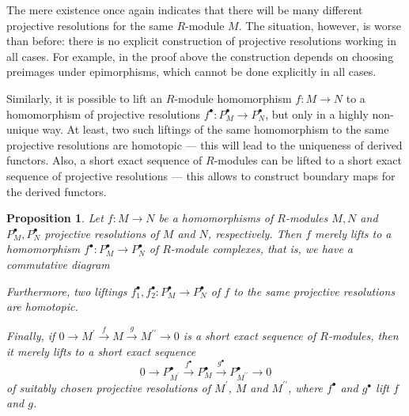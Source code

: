 \documentclass{amsart}
\theoremstyle{plain}
\numberwithin{equation}{section} %
\numberwithin{figure}{section} %
\theoremstyle{plain}
\theoremstyle{plain}
\theoremstyle{plain}
\theoremstyle{plain}
\theoremstyle{plain}
\newtheorem{prop}[thm]{Proposition} %
\theoremstyle{plain}
\theoremstyle{remark}
\theoremstyle{remark}
\theoremstyle{remark}
\begin{document}
The mere existence once again indicates that there will be many different projective resolutions for the same $R$-module $M$. The situation, however, is worse than before: there is no explicit construction of projective resolutions working in all cases. For example, in the proof above the construction depends on choosing preimages under epimorphisms, which cannot be done explicitly in all cases.

Similarly, it is possible to lift an $R$-module homomorphism $f : M \rightarrow N$ to a homomorphism of projective resolutions $f^\bullet : P^\bullet_M \rightarrow P^\bullet_N$, but only in a highly non-unique way. At least, two such liftings of the same homomorphism to the same projective resolutions are homotopic --- this will lead to the uniqueness of derived functors. Also, a short exact sequence of $R$-modules can be lifted to a short exact sequence of projective resolutions --- this allows to construct boundary maps for the derived functors.
\begin{prop} \label{proj-res-lift-prop}
Let $f: M \rightarrow N$ be a homomorphisms of $R$-modules $M, N$ and $P^\bullet_M, P^\bullet_N$ projective resolutions of $M$ and $N$, respectively. Then $f$ merely lifts to a homomorphism $f^\bullet: P^\bullet_M \rightarrow P^\bullet_N$ of $R$-module complexes, that is, we have a commutative diagram

\begin{center}
\end{center}

Furthermore, two liftings $f_1^\bullet, f_2^\bullet: P_M^\bullet \rightarrow P_N^\bullet$ of $f$ to the same projective resolutions are homotopic.

Finally, if $0 \rightarrow M^\prime \stackrel{f}{\rightarrow} M \stackrel{g}{\rightarrow} M^{\prime\prime} \rightarrow 0$ is a short exact sequence of $R$-modules, then it merely lifts to a short exact sequence
\[ 0 \rightarrow P_{M^\prime}^\bullet \stackrel{f^\bullet}{\rightarrow} P_M^\bullet \stackrel{g^\bullet}{\rightarrow} P_{M^{\prime\prime}}^\bullet \rightarrow 0 \]
of suitably chosen projective resolutions of $M^\prime$, $M$ and $M^{\prime\prime}$, where $f^\bullet$ and $g^\bullet$ lift $f$ and $g$.
\end{prop}
\end{document}
